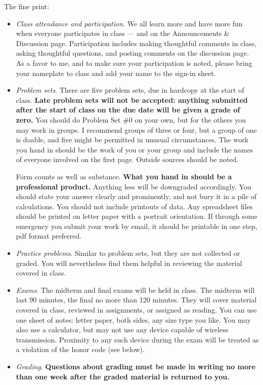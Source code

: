 \documentclass[12pt]{article}
\begin{document}
The fine print:
\begin{itemize}

\item \textit{Class attendance and participation}.
We all learn more and have more fun when everyone participates in class ---
and on the Announcements \& Discussion page.
Participation includes making thoughtful comments in class,
asking thoughtful questions,
and posting comments on the discussion page.
As a favor to me, and to make sure your participation is noted,
please bring your nameplate to class and add your name to the
sign-in sheet.

\item \textit{Problem sets}.
There are five problem sets,
due in hardcopy at the start of class.
{\bf Late problem sets will not be accepted:
anything submitted after the start of class on the due date will be given a grade of zero.}
You should do Problem Set \#0 on your own,
but for the others you may work in groups.
I recommend groups of three or four,
but a group of one is doable, and five might be permitted in unusual circumstances.
The work you hand in should be the work of you or your group
and include the names of everyone involved on the first page.
Outside sources should be noted.

Form counts as well as substance.
{\bf What you hand in should be a  professional product.}
Anything less will be downgraded accordingly.
You should state your answer clearly and prominently,
and not bury it in a pile of calculations.
You should not include printouts of data.
Any spreadsheet files should be printed on letter paper
with a portrait orientation.
If through some emergency you submit your work by email,
it should be printable in one step,
pdf format preferred.

\item \textit{Practice problems}.
Similar to problem sets, but they are not collected or graded.
You will nevertheless find them helpful in reviewing the
material covered in class.


\item \textit{Exams}.
The midterm and final exams will be held in class.
The midterm will last 90 minutes, the final no more than 120 minutes.
They will cover material covered in class, reviewed in assignments, 
or assigned as reading.
You can use one sheet of notes: letter paper, both sides, any size type you like.
You may also use a calculator, but may not use any device
capable of wireless transmission.  Proximity to any such
device during the exam will be treated as a violation of the honor
code (see below).

\item \textit{Grading}.
{\bf Questions about grading must be made in writing no more than one week
after the graded material is returned to you.}


\end{itemize}
\end{document}
